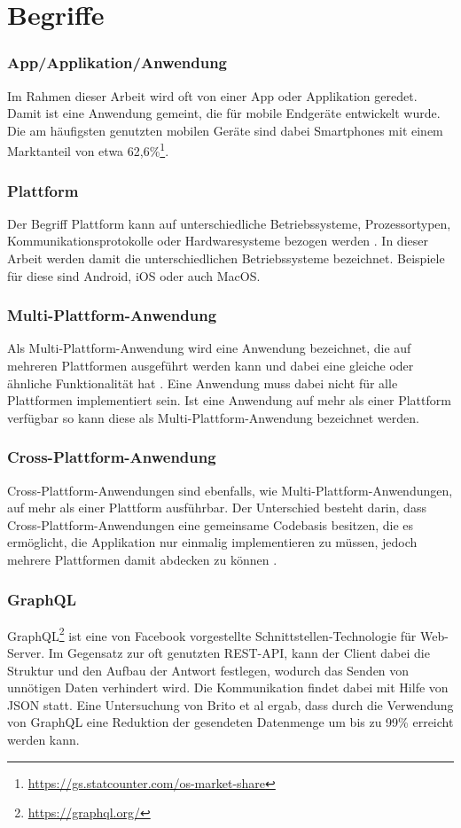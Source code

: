 \section{Begriffe}
\subsubsection{App/Applikation/Anwendung}
Im Rahmen dieser Arbeit wird oft von einer App oder Applikation geredet. Damit ist eine Anwendung gemeint, die für mobile Endgeräte entwickelt wurde. Die am häufigsten genutzten mobilen Geräte sind dabei Smartphones mit einem Marktanteil von etwa 62,6\%\footnote{\url{https://gs.statcounter.com/os-market-share}}.

\subsubsection{Plattform}
Der Begriff Plattform kann auf unterschiedliche Betriebssysteme, Prozessortypen, Kommunikationsprotokolle oder Hardwaresysteme bezogen werden \cite{2014Mulit_plattform_definition}. In dieser Arbeit werden damit die unterschiedlichen Betriebssysteme bezeichnet. Beispiele für diese sind Android, iOS oder auch MacOS.

\subsubsection{Multi-Plattform-Anwendung}
Als Multi-Plattform-Anwendung wird eine Anwendung bezeichnet, die auf mehreren Plattformen ausgeführt werden kann und dabei eine gleiche oder ähnliche Funktionalität hat \cite{2014Mulit_plattform_definition}. Eine Anwendung muss dabei nicht für alle Plattformen implementiert sein. Ist eine Anwendung auf mehr als einer Plattform verfügbar so kann diese als Multi-Plattform-Anwendung bezeichnet werden.

\subsubsection{Cross-Plattform-Anwendung}
Cross-Plattform-Anwendungen sind ebenfalls, wie Multi-Plattform-Anwendungen, auf mehr als einer Plattform ausführbar. Der Unterschied besteht darin, dass Cross-Plattform-Anwendungen eine gemeinsame Codebasis besitzen, die es ermöglicht, die Applikation nur einmalig implementieren zu müssen, jedoch mehrere Plattformen damit abdecken zu können \cite{2014_Cross_plattform}.

\subsubsection{GraphQL}
GraphQL\footnote{\url{https://graphql.org/}} ist eine von Facebook vorgestellte Schnittstellen-Technologie für Web-Server. Im Gegensatz zur oft genutzten REST-API, kann der Client dabei die Struktur und den Aufbau der Antwort festlegen, wodurch das Senden von unnötigen Daten verhindert wird. Die Kommunikation findet dabei mit Hilfe von JSON statt. Eine Untersuchung von Brito et al \cite{IEEE_GraphQL} ergab, dass durch die Verwendung von GraphQL eine Reduktion der gesendeten Datenmenge um bis zu 99\% erreicht werden kann. 